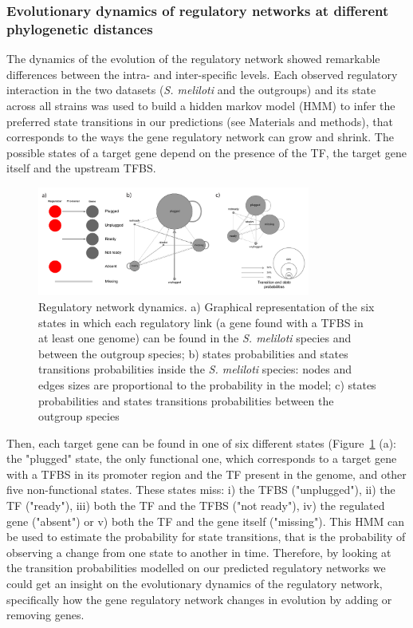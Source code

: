 \subsubsection{Evolutionary dynamics of regulatory networks at different phylogenetic distances}
The dynamics of the evolution of the regulatory network showed remarkable differences between the intra- and inter-specific levels.
 Each observed regulatory interaction in the two datasets (\textit{S. meliloti} and the outgroups) and its state across all strains was used to build a hidden markov model (HMM) to infer the preferred state transitions in our predictions (see Materials and methods), that corresponds to the ways the gene regulatory network can grow and shrink.
 The possible states of a target gene depend on the presence of the TF, the target gene itself and the upstream TFBS.
\begin{figure}[!tb]
	\centering
	\includegraphics[width=0.8\textwidth]{./figures/Appendix_1/4_reg}
  	\caption{\label{fig:reg4} Regulatory network dynamics. a) Graphical representation of the six states in which each regulatory link (a gene found with a TFBS in at least one genome) can be found in the \textit{S. meliloti} species and between the outgroup species; b) states probabilities and states transitions probabilities inside the \textit{S. meliloti} species: nodes and edges sizes are proportional to the probability in the model; c) states probabilities and states transitions probabilities between the outgroup species}
\end{figure}
 Then, each target gene can be found in one of six different states (Figure~\ref{fig:reg4} (a): the "plugged" state, the only functional one, which corresponds to a target gene with a TFBS in its promoter region and the TF present in the genome, and other five non-functional states.
 These states miss: i) the TFBS ("unplugged"), ii) the TF ("ready"), iii) both the TF and the TFBS ("not ready"), iv) the regulated gene ("absent") or v) both the TF and the gene itself ("missing").
This HMM can be used to estimate the probability for state transitions, that is the probability of observing a change from one state to another in time.
 Therefore, by looking at the transition probabilities modelled on our predicted regulatory networks we could get an insight on the evolutionary dynamics of the regulatory network, specifically how the gene regulatory network changes in evolution by adding or removing genes.

